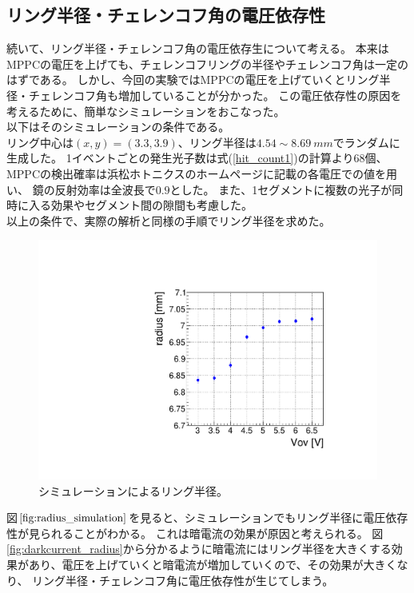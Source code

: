 \documentclass[uplatex, titlepage, dvipdfmx, 12pt, a4paper]{jsreport}
\begin{document}
    \subsection{リング半径・チェレンコフ角の電圧依存性}
    続いて、リング半径・チェレンコフ角の電圧依存生について考える。
    本来はMPPCの電圧を上げても、チェレンコフリングの半径やチェレンコフ角は一定のはずである。
    しかし、今回の実験ではMPPCの電圧を上げていくとリング半径・チェレンコフ角も増加していることが分かった。
    この電圧依存性の原因を考えるために、簡単なシミュレーションをおこなった。\\
    以下はそのシミュレーションの条件である。\\
    リング中心は$\left(x,y\right)=\left(3.3,3.9\right)$、リング半径は$4.54\sim\SI{8.69}{mm}$でランダムに生成した。
    1イベントごとの発生光子数は式(\ref{hit_count1})の計算より68個、MPPCの検出確率は浜松ホトニクスのホームページに記載の各電圧での値を用い、
    鏡の反射効率は全波長で$0.9$とした。
    また、1セグメントに複数の光子が同時に入る効果やセグメント間の隙間も考慮した。\\
    以上の条件で、実際の解析と同様の手順でリング半径を求めた。
    \begin{figure}[hbtp]
      \begin{center} 
        \includegraphics[scale=0.4, clip]{image/radius_simulation.pdf}
        \caption{シミュレーションによるリング半径。} 
        \label{fig:radius_simulation} 
      \end{center}
    \end{figure}
    図$\ref{fig:radius_simulation}$を見ると、シミュレーションでもリング半径に電圧依存性が見られることがわかる。
    これは暗電流の効果が原因と考えられる。
    図\ref{fig:darkcurrent_radius}から分かるように暗電流にはリング半径を大きくする効果があり、電圧を上げていくと暗電流が増加していくので、その効果が大きくなり、
    リング半径・チェレンコフ角に電圧依存性が生じてしまう。
\end{document}
